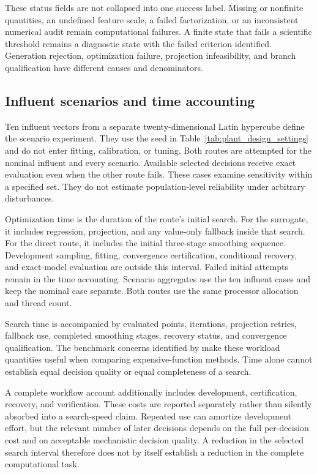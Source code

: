 These status fields are not collapsed into one success label. Missing or nonfinite quantities, an undefined feature scale, a failed factorization, or an inconsistent numerical audit remain computational failures. A finite state that fails a scientific threshold remains a diagnostic state with the failed criterion identified. Generation rejection, optimization failure, projection infeasibility, and branch qualification have different causes and denominators.

\subsection{Influent scenarios and time accounting}

Ten influent vectors from a separate twenty-dimensional Latin hypercube define the scenario experiment. They use the seed in Table~\ref{tab:plant_design_settings} and do not enter fitting, calibration, or tuning. Both routes are attempted for the nominal influent and every scenario. Available selected decisions receive exact evaluation even when the other route fails. These cases examine sensitivity within a specified set. They do not estimate population-level reliability under arbitrary disturbances.

Optimization time is the duration of the route's initial search. For the surrogate, it includes regression, projection, and any value-only fallback inside that search. For the direct route, it includes the initial three-stage smoothing sequence. Development sampling, fitting, convergence certification, conditional recovery, and exact-model evaluation are outside this interval. Failed initial attempts remain in the time accounting. Scenario aggregates use the ten influent cases and keep the nominal case separate. Both routes use the same processor allocation and thread count.

Search time is accompanied by evaluated points, iterations, projection retries, fallback use, completed smoothing stages, recovery status, and convergence qualification. The benchmark concerns identified by \citet{Bliek2023} make these workload quantities useful when comparing expensive-function methods. Time alone cannot establish equal decision quality or equal completeness of a search.

A complete workflow account additionally includes development, certification, recovery, and verification. These costs are reported separately rather than silently absorbed into a search-speed claim. Repeated use can amortize development effort, but the relevant number of later decisions depends on the full per-decision cost and on acceptable mechanistic decision quality. A reduction in the selected search interval therefore does not by itself establish a reduction in the complete computational task.

